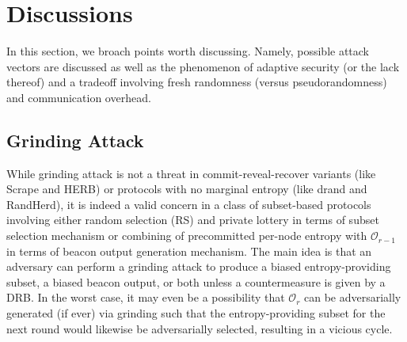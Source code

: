 \documentclass[letterpaper,twocolumn,10pt]{article}
\theoremstyle{definition}
\theoremstyle{remark}
\begin{document}
\section{Discussions}
In this section, we broach points worth discussing. Namely, possible attack vectors are discussed as well as the phenomenon of adaptive security (or the lack thereof) and a tradeoff involving fresh randomness (versus pseudorandomness) and communication overhead.
\subsection{Grinding Attack}
While grinding attack is not a threat in commit-reveal-recover variants (like Scrape and HERB) or protocols with no marginal entropy (like drand and RandHerd), it is indeed a valid concern in a class of subset-based protocols involving either random selection (RS) and private lottery in terms of subset selection mechanism or combining of precommitted per-node entropy with $\mathcal{O}_{r - 1}$ in terms of beacon output generation mechanism. The main idea is that an adversary can perform a grinding attack to produce a biased entropy-providing subset, a biased beacon output, or both unless a countermeasure is given by a DRB. In the worst case, it may even be a possibility that $\mathcal{O}_r$ can be adversarially generated (if ever) via grinding such that the entropy-providing subset for the next round would likewise be adversarially selected, resulting in a vicious cycle.
\end{document}
